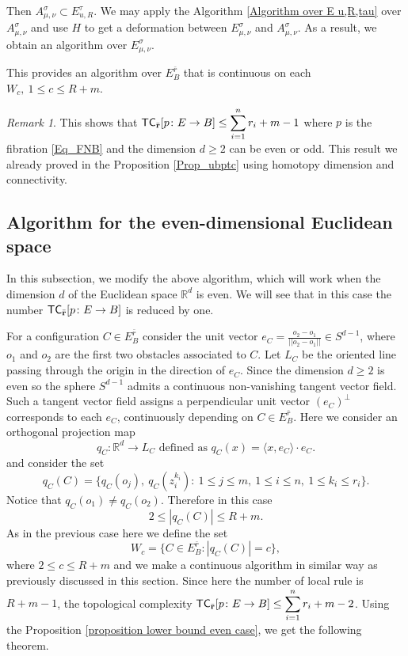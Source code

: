 \documentclass[12pt,oneside,reqno]{amsart}
\theoremstyle{plain}
\theoremstyle{definition}
\theoremstyle{remark}
\newtheorem{remark}[theorem]{Remark}
\newcommand{\TC}{{\sf {TC}}}
\newcommand{\rr}{{\mathbb {R}}}
\begin{document}
\noindent Then $A_{\mu, \nu}^{\sigma} \subset E_{u, R}^{\tau}$. We may apply the Algorithm \ref{Algorithm over E u,R,tau} over $A_{\mu, \nu}^{\sigma}$ and use $H$ to get a deformation between $E_{\mu, \nu}^{\sigma}$ and $A_{\mu, \nu}^{\sigma}$. As a result, we obtain an algorithm over $E_{\mu, \nu}^{\sigma}$.

This provides an algorithm over $E^{\bar{r}}_B$ that is continuous on each $W_c, ~ 1\leq c \leq R+m$.

\begin{remark}
    This shows that $\TC_{\bar{\textbf{r}}}[p\colon E \to B] \leq \displaystyle\sum^{n}_{i=1} {r_i} + m -1$ where $p$ is the fibration \eqref{Eq_FNB} and the dimension $d\geq 2$ can be even or odd. This result we already proved in the Proposition \ref{Prop_ubptc} using homotopy dimension and connectivity.
\end{remark}

\subsection*{Algorithm for the even-dimensional Euclidean space}
In this subsection, we modify the above algorithm, which will work when the dimension $d$ of the Euclidean space $\rr^d$ is even. We will see that in this case the number $\TC_{\bar{\textbf{r}}}[p\colon E \to B]$ is reduced by one.

For a configuration $C\in E^{\bar{r}}_B$ 
consider the unit vector $e_C = \frac{o_2 - o_1}{||o_2 - o_1||}\in S^{d-1}$, where $o_1$ and $o_2$ are the first two obstacles associated to $C$. Let $L_C$ be the oriented line passing through the origin in the direction of $e_C$. Since the dimension $d\geq 2$ is even so the sphere $S^{d-1}$ admits a continuous non-vanishing tangent vector field. Such a tangent vector field assigns a perpendicular unit vector $(e_C)^\perp$ corresponds to each $e_C$, continuously depending on $C\in E^{\bar{r}}_B$. Here we consider an orthogonal projection map $$q_C : \mathbb{R}^d\to L_C \text{ defined as } q_C(x)=\langle  x, e_C \rangle  \cdot  e_C.$$
and consider the set
$$q_C(C) = \{q_C(o_j), ~q_C(z_i^{k_i}): ~1\leq j \leq m,~ 1\leq i \leq n, ~ 1\leq k_i \leq r_i \}.$$
Notice that $q_C(o_1)\neq q_C(o_2)$. Therefore in this case $$2\leq |q_C(C)|\leq R + m.$$
As in the previous case here we define the set $$W_c=\big\{C\in E^{\bar{r}}_B : |q_C(C)| = c \big\},$$
where $2\leq c \leq R + m$ and we make a continuous algorithm in similar way as previously discussed in this section. Since here the number of local rule is $R+m-1$, the topological complexity $\TC_{\bar{\textbf{r}}}[p\colon E \to B] \leq \displaystyle\sum^{n}_{i=1} {r_i} + m -2$. Using the Proposition \ref{proposition lower bound even case}, we get the following theorem.
\end{document}
